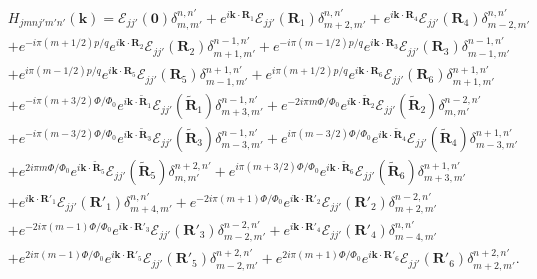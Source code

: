 \documentclass{report}
\begin{document}
\begin{equation}
	\begin{aligned}
		&H_{jmnj'm'n'}(\mathbf{k})
		  = \mathcal{E}_{jj'}(\mathbf{0}) \delta_{m,m'}^{n,n'} + e^{i\mathbf{k} \cdot \mathbf{R}_{1}}\mathcal{E}_{jj'}(\mathbf{R}_{1}) \delta_{m+2,m'}^{n,n'} + e^{i\mathbf{k} \cdot \mathbf{R}_{4}}\mathcal{E}_{jj'}(\mathbf{R}_{4})  \delta_{m-2,m'}^{n,n'}  \\
		 & + e^{-i\pi(m + 1/2)p / q}e^{i\mathbf{k} \cdot \mathbf{R}_{2}} \mathcal{E}_{jj'}(\mathbf{R}_{2}) \delta_{m+1,m'}^{n-1,n'} + e^{-i\pi(m - 1/2)p / q} e^{i\mathbf{k} \cdot \mathbf{R}_{3}} \mathcal{E}_{jj'}(\mathbf{R}_{3}) \delta_{m-1,m'}^{n-1,n'} \\
		 & + e^{i\pi(m - 1/2)p / q} e^{i\mathbf{k} \cdot \mathbf{R}_{5}} \mathcal{E}_{jj'}(\mathbf{R}_{5}) \delta_{m-1,m'}^{n+1,n'} + e^{i\pi(m + 1/2)p / q} e^{i\mathbf{k} \cdot \mathbf{R}_{6}} \mathcal{E}_{jj'}(\mathbf{R}_{6}) \delta_{m+1,m'}^{n+1,n'} \\
		 & + e^{- i\pi(m + 3/2)\Phi/\Phi_{0} } e^{i \mathbf{k} \cdot \tilde{\mathbf{R}}_{1}} \mathcal{E}_{jj'}(\tilde{\mathbf{R}}_{1}) \delta_{m+3,m'}^{n-1,n'} + e^{- 2i\pi m\Phi/\Phi_{0} } e^{i \mathbf{k} \cdot \tilde{\mathbf{R}}_{2}} \mathcal{E}_{jj'}(\tilde{\mathbf{R}}_{2}) \delta_{m,m'}^{n-2,n'} \\
		 & + e^{- i\pi(m - 3/2)\Phi/\Phi_{0} } e^{i \mathbf{k} \cdot \tilde{\mathbf{R}}_{3}} \mathcal{E}_{jj'}(\tilde{\mathbf{R}}_{3}) \delta_{m-3,m'}^{n-1,n'} + e^{ i\pi (m-3/2)\Phi/\Phi_{0} } e^{i \mathbf{k} \cdot \tilde{\mathbf{R}}_{4}} \mathcal{E}_{jj'}(\tilde{\mathbf{R}}_{4}) \delta_{m-3,m'}^{n+1,n'} \\
		 & + e^{2 i\pi m \Phi/\Phi_{0} } e^{i \mathbf{k} \cdot \tilde{\mathbf{R}}_{5}} \mathcal{E}_{jj'}(\tilde{\mathbf{R}}_{5}) \delta_{m,m'}^{n+2,n'} + e^{ i\pi (m+3/2)\Phi/\Phi_{0} } e^{i \mathbf{k} \cdot \tilde{\mathbf{R}}_{6}} \mathcal{E}_{jj'}(\tilde{\mathbf{R}}_{6})\delta_{m+3,m'}^{n+1,n'} \\
		 & + e^{i \mathbf{k} \cdot \mathbf{R}'_{1}} \mathcal{E}_{jj'}(\mathbf{R}'_{1}) \delta_{m+4,m'}^{n,n'} + e^{-2i\pi(m + 1)\Phi / \Phi_{0}} e^{i \mathbf{k} \cdot \mathbf{R}'_{2}} \mathcal{E}_{jj'}(\mathbf{R}'_{2}) \delta_{m+2,m'}^{n-2,n'}  \\
		 & + e^{-2i\pi(m - 1)\Phi / \Phi_{0}} e^{i \mathbf{k} \cdot \mathbf{R}'_{3}} \mathcal{E}_{jj'}(\mathbf{R}'_{3}) \delta_{m-2,m'}^{n-2,n'} + e^{i \mathbf{k} \cdot \mathbf{R}'_{4}} \mathcal{E}_{jj'}(\mathbf{R}'_{4}) \delta_{m-4,m'}^{n,n'}                                 \\
		 & + e^{2i\pi(m - 1)\Phi / \Phi_{0}} e^{i \mathbf{k} \cdot \mathbf{R}'_{5}} \mathcal{E}_{jj'}(\mathbf{R}'_{5}) \delta_{m-2,m'}^{n+2,n'} + e^{2i\pi(m + 1)\Phi / \Phi_{0}} e^{i \mathbf{k} \cdot \mathbf{R}'_{6}} \mathcal{E}_{jj'}(\mathbf{R}'_{6}) \delta_{m+2,m'}^{n+2,n'}.
	\end{aligned}
\end{equation}
\end{document}
